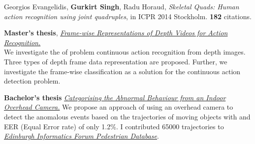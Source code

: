 \documentclass[line, margin]{res}
\begin{document}
\begin{resume}
Georgios Evangelidis, \textbf{Gurkirt Singh}, Radu Horaud,
\emph{Skeletal Quads: Human action recognition using joint quadruples}, 
in ICPR 2014 Stockholm. \textbf{182} citations.

\textbf{Master's thesis}, \href{https://sites.google.com/site/gurkirtcv/research/master-thesis}{\emph{Frame-wise Representations of Depth Videos for Action Recognition.}}\\
We investigate the of problem continuous action recognition from depth images. 
Three types of depth frame data representation are proposed. 
Further, we investigate the frame-wise classification as a solution for the continuous action detection problem.

\textbf{Bachelor's thesis} \href{https://sites.google.com/site/gurkirtcv/research/btechproject}{\emph{Categorising the Abnormal Behaviour from an Indoor Overhead Camera.}}
We propose an approach of using an overhead camera to detect the anomalous events based on the trajectories of moving objects with and EER (Equal Error rate) of only 1.2\%. I contributed 65000 trajectories to \href{http://homepages.inf.ed.ac.uk/rbf/FORUMTRACKING/}{\emph{Edinburgh Informatics Forum Pedestrian Database}}.


\end{resume}
\end{document}
